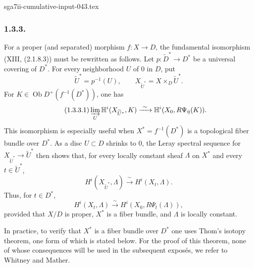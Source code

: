 \begin{filecontents*}{sga7ii-cumulative-input-043.tex}
\subsubsection*{1.3.3.}
For a proper (and separated) morphism $f:X\longrightarrow D$, the
fundamental isomorphism (XIII, (2.1.8.3)) must be rewritten as follows.
Let $p:\widetilde D^*\longrightarrow D^*$ be a universal covering of
$D^*$.  For every neighborhood $U$ of $0$ in $D$, put
\[
\widetilde U^*=p^{-1}(U),
\qquad
X_{\widetilde U^*}=X\times_D\widetilde U^*.
\]
For $K\in\operatorname{Ob}D^+(f^{-1}(D^*))$, one has
\begin{equation}\tag{1.3.3.1}
\varinjlim_U\mathbb H^i(X_{\widetilde U^*},K)
\xrightarrow{\ \sim\ }
\mathbb H^i(X_0,R\Psi_{\bar\eta}(K)).
\end{equation}
This isomorphism is especially useful when
$X^*=f^{-1}(D^*)$ is a topological fiber bundle over $D^*$.  As a
disc $U\subset D$ shrinks to $0$, the Leray spectral sequence for
$X_{\widetilde U^*}\longrightarrow\widetilde U^*$ then shows that,
for every locally constant sheaf $\Lambda$ on $X^*$ and every
$t\in\widetilde U^*$,
\[
H^i(X_{\widetilde U^*},\Lambda)
\xrightarrow{\ \sim\ }H^i(X_t,\Lambda).
\]
Thus, for $t\in D^*$,
\begin{equation}\tag{1.3.3.2}
H^i(X_t,\Lambda)
\xrightarrow{\ \sim\ }
H^i(X_0,R\Psi_t(\Lambda)),
\end{equation}
provided that $X/D$ is proper, $X^*$ is a fiber bundle, and
$\Lambda$ is locally constant.

In practice, to verify that $X^*$ is a fiber bundle over $D^*$ one
uses Thom's isotopy theorem, one form of which is stated below.  For
the proof of this theorem, none of whose consequences will be used in
the subsequent expos\'es, we refer to Whitney and Mather.

\end{filecontents*}
